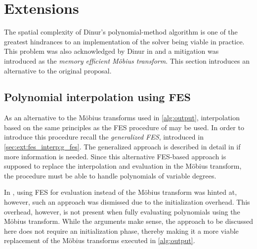\section{Extensions} \label{sec:ext}
The spatial complexity of Dinur's polynomial-method algorithm is one of the greatest hindrances to an implementation of the solver being viable in practice. This problem was also acknowledged by Dinur in \cite{eurocrypt-2021-30841} and a mitigation was introduced as the \textit{memory efficient Möbius transform}. This section introduces an alternative to the original proposal.
 
\subsection{Polynomial interpolation using FES} \label{sec:ext:fes_interp}
As an alternative to the Möbius transforms used in \cref{alg:output}, interpolation based on the same principles as the FES procedure of \cite{ches-2010-23990} may be used. In order to introduce this procedure recall the \textit{generalized FES}, introduced in \cref{sec:ext:fes_interp:g_fes}. The generalized approach is described in detail in \cite{tungchoumasters} if more information is needed. Since this alternative FES-based approach is supposed to replace the interpolation and evaluation in the Möbius transform, the procedure must be able to handle polynomials of variable degrees.

In \cite{eurocrypt-2021-30841}, using FES for evaluation instead of the Möbius transform was hinted at, however, such an approach was dismissed due to the initialization overhead. This overhead, however, is not present when fully evaluating polynomials using the Möbius transform. While the arguments make sense, the approach to be discussed here does not require an initialization phase, thereby making it a more viable replacement of the Möbius transforms executed in \cref{alg:output}.

